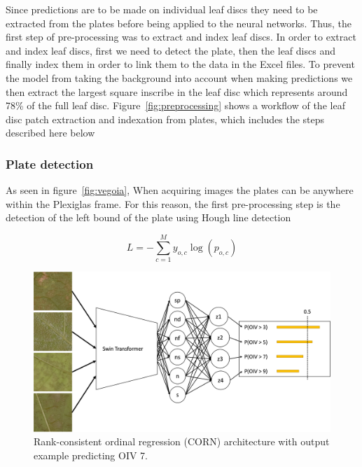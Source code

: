 \documentclass[english]{article}
\begin{document}
Since predictions are to be made on individual leaf discs they need to be extracted from the plates before being applied to the neural networks. Thus, the first step of pre-processing was to extract and index leaf discs. In order to extract and index leaf discs, first we need to detect the plate, then the leaf discs and finally index them in order to link them to the data in the Excel files. To prevent the model from taking the background into account when making predictions we then extract the largest square inscribe in the leaf disc which represents around 78\% of the full leaf disc. Figure~\ref{fig:preprocessing} shows a workflow of the leaf disc patch extraction and indexation from plates, which includes the steps described here below

\subsubsection{Plate detection}
As seen in figure~\ref{fig:vegoia}, When acquiring images the plates can be anywhere within the Plexiglas frame. For this reason, the first pre-processing step is the detection of the left bound of the plate using Hough line detection~\parencite{duda}










\begin{equation}
    L = -\sum_{c=1}^My_{o,c}\log(p_{o,c})\label{fml:crossentropy}
\end{equation}

\begin{figure}[H]
    \centering
    \includegraphics[width=0.9\linewidth]{p_viticola/resources/images/2023_a_oiv_bin_corn.png}
    \caption{Rank-consistent ordinal regression (CORN) architecture with output example predicting OIV 7.}
    \label{fig:corn}
\end{figure}
\end{document}
